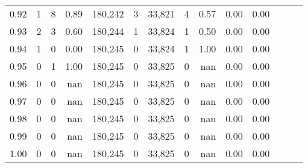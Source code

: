 \begin{tabular}{rrrrrrrrrrrrrr}
0.92 &      1 &      8 &  0.89 &  180,242 &        3 &  33,821 &       4 &  0.57 &  0.00 &      0.00 \\
0.93 &      2 &      3 &  0.60 &  180,244 &        1 &  33,824 &       1 &  0.50 &  0.00 &      0.00 \\
0.94 &      1 &      0 &  0.00 &  180,245 &        0 &  33,824 &       1 &  1.00 &  0.00 &      0.00 \\
0.95 &      0 &      1 &  1.00 &  180,245 &        0 &  33,825 &       0 &   nan &  0.00 &      0.00 \\
0.96 &      0 &      0 &   nan &  180,245 &        0 &  33,825 &       0 &   nan &  0.00 &      0.00 \\
0.97 &      0 &      0 &   nan &  180,245 &        0 &  33,825 &       0 &   nan &  0.00 &      0.00 \\
0.98 &      0 &      0 &   nan &  180,245 &        0 &  33,825 &       0 &   nan &  0.00 &      0.00 \\
0.99 &      0 &      0 &   nan &  180,245 &        0 &  33,825 &       0 &   nan &  0.00 &      0.00 \\
1.00 &      0 &      0 &   nan &  180,245 &        0 &  33,825 &       0 &   nan &  0.00 &      0.00 \\
\bottomrule
\end{tabular}
